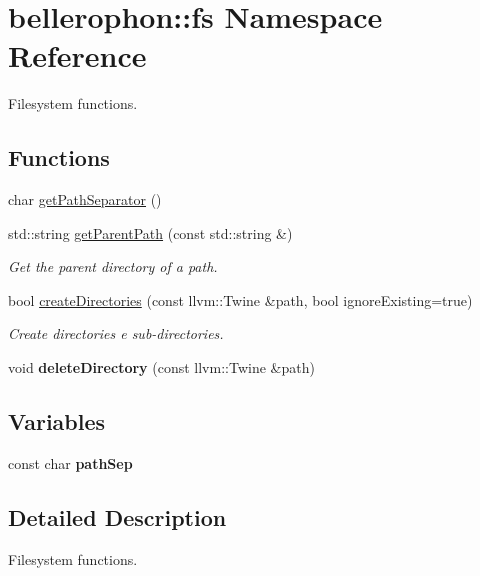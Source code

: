 \hypertarget{namespacebellerophon_1_1fs}{}\section{bellerophon\+:\+:fs Namespace Reference}
\label{namespacebellerophon_1_1fs}


Filesystem functions.  


\subsection*{Functions}
\begin{DoxyCompactItemize}
\item 
char \hyperlink{namespacebellerophon_1_1fs_a5fdf1fe521ee409381f36acf1457a858}{get\+Path\+Separator} ()
\item 
std\+::string \hyperlink{namespacebellerophon_1_1fs_acd4c35b60168bc21d107608e56128664}{get\+Parent\+Path} (const std\+::string \&)
\begin{DoxyCompactList}\small\item\em Get the parent directory of a path. \end{DoxyCompactList}\item 
bool \hyperlink{namespacebellerophon_1_1fs_a863646cc2d1337eb038f7fdb45012a3a}{create\+Directories} (const llvm\+::\+Twine \&path, bool ignore\+Existing=true)
\begin{DoxyCompactList}\small\item\em Create directories e sub-\/directories. \end{DoxyCompactList}\item 
\hypertarget{namespacebellerophon_1_1fs_ad2da81a3ede3323f05544977de6d3408}{}\label{namespacebellerophon_1_1fs_ad2da81a3ede3323f05544977de6d3408} 
void {\bfseries delete\+Directory} (const llvm\+::\+Twine \&path)
\end{DoxyCompactItemize}
\subsection*{Variables}
\begin{DoxyCompactItemize}
\item 
\hypertarget{namespacebellerophon_1_1fs_a058ef4b019d24eea183b04e5da71c288}{}\label{namespacebellerophon_1_1fs_a058ef4b019d24eea183b04e5da71c288} 
const char {\bfseries path\+Sep}
\end{DoxyCompactItemize}


\subsection{Detailed Description}
Filesystem functions. 

